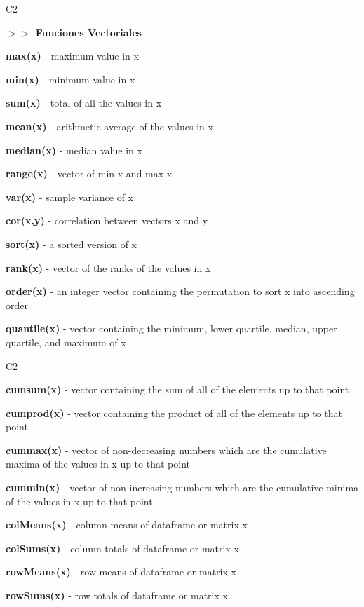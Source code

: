 \documentclass{beamer}
\theoremstyle{definition}
\theoremstyle{remark}
\begin{document}
\begin{frame}{C2}

\textbf{$>>$ Funciones Vectoriales}


\hfill

\textbf{max(x)} -	maximum value in x

\textbf{min(x)} -	minimum value in x

\textbf{sum(x)} -	total of all the values in x

\textbf{mean(x)} -	arithmetic average of the values in x

\textbf{median(x)} - 	median value in x

\textbf{range(x)} -	vector of min x and max x

\textbf{var(x)}	-	sample variance of x

\textbf{cor(x,y)} -	correlation between vectors x and y

\textbf{sort(x)}	- a sorted version of x

\textbf{rank(x)} -	vector of the ranks of the values in x

\textbf{order(x)} -	an integer vector containing the permutation to sort x into ascending order

\textbf{quantile(x)} - 	vector containing the minimum, lower quartile, median, upper quartile, and
		maximum of x




\end{frame}


\begin{frame}{C2}

\textbf{cumsum(x)} -	vector containing the sum of all of the elements up to that point

\textbf{cumprod(x)} -	vector containing the product of all of the elements up to that point

\textbf{cummax(x)} -	vector of non-decreasing numbers which are the cumulative maxima of 
the values in x up to that point

\textbf{cummin(x)}	 - vector of non-increasing numbers which are the cumulative minima of the
		values in x up to that point
		
\textbf{colMeans(x)} -	column means of dataframe or matrix x

\textbf{colSums(x)} -	column totals of dataframe or matrix x

\textbf{rowMeans(x)} -	row means of dataframe or matrix x

\textbf{rowSums(x)} -	row totals of dataframe or matrix x


\end{frame}
\end{document}
